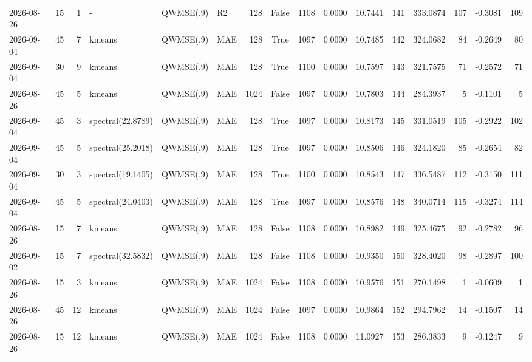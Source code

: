 \documentclass[10pt]{article}
\begin{document}
\begin{landscape}
\begin{longtable}{@{}lrrlllrcrrrrrrrr@{}}
2026-08-26 & 15 & 1 & - & QWMSE(.9) & R2 & 128 & False & 1108 & 0.0000 & 10.7441 & 141 & 333.0874 & 107 & -0.3081 & 109 \\
2026-09-04 & 45 & 7 & kmeans & QWMSE(.9) & MAE & 128 & True & 1097 & 0.0000 & 10.7485 & 142 & 324.0682 & 84 & -0.2649 & 80 \\
2026-09-04 & 30 & 9 & kmeans & QWMSE(.9) & MAE & 128 & True & 1100 & 0.0000 & 10.7597 & 143 & 321.7575 & 71 & -0.2572 & 71 \\
2026-08-26 & 45 & 5 & kmeans & QWMSE(.9) & MAE & 1024 & False & 1097 & 0.0000 & 10.7803 & 144 & 284.3937 & 5 & -0.1101 & 5 \\
2026-09-04 & 45 & 3 & spectral(22.8789) & QWMSE(.9) & MAE & 128 & True & 1097 & 0.0000 & 10.8173 & 145 & 331.0519 & 105 & -0.2922 & 102 \\
2026-09-04 & 45 & 5 & spectral(25.2018) & QWMSE(.9) & MAE & 128 & True & 1097 & 0.0000 & 10.8506 & 146 & 324.1820 & 85 & -0.2654 & 82 \\
2026-09-04 & 30 & 3 & spectral(19.1405) & QWMSE(.9) & MAE & 128 & True & 1100 & 0.0000 & 10.8543 & 147 & 336.5487 & 112 & -0.3150 & 111 \\
2026-09-04 & 45 & 5 & spectral(24.0403) & QWMSE(.9) & MAE & 128 & True & 1097 & 0.0000 & 10.8576 & 148 & 340.0714 & 115 & -0.3274 & 114 \\
2026-08-26 & 15 & 7 & kmeans & QWMSE(.9) & MAE & 128 & False & 1108 & 0.0000 & 10.8982 & 149 & 325.4675 & 92 & -0.2782 & 96 \\
2026-09-02 & 15 & 7 & spectral(32.5832) & QWMSE(.9) & MAE & 128 & False & 1108 & 0.0000 & 10.9350 & 150 & 328.4020 & 98 & -0.2897 & 100 \\
2026-08-26 & 15 & 3 & kmeans & QWMSE(.9) & MAE & 1024 & False & 1108 & 0.0000 & 10.9576 & 151 & 270.1498 & 1 & -0.0609 & 1 \\
2026-08-26 & 45 & 12 & kmeans & QWMSE(.9) & MAE & 1024 & False & 1097 & 0.0000 & 10.9864 & 152 & 294.7962 & 14 & -0.1507 & 14 \\
2026-08-26 & 15 & 12 & kmeans & QWMSE(.9) & MAE & 1024 & False & 1108 & 0.0000 & 11.0927 & 153 & 286.3833 & 9 & -0.1247 & 9 \\
\bottomrule
\end{longtable}
\clearpage

\end{landscape}
\end{document}
